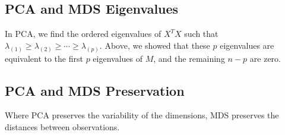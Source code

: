 \documentclass[a4paper]{article}
\begin{document}
\subsection{PCA and MDS Eigenvalues}
In PCA, we find the ordered eigenvalues of $X^TX$ such that 
$\lambda_{(1)} \ge \lambda_{(2)} \ge \cdots \ge \lambda_{(p)}$.  Above, we showed
that these $p$ eigenvalues are equivalent to the first $p$ eigenvalues
of $M$, and the remaining $n-p$ are zero.

\subsection{PCA and MDS Preservation}
Where PCA preserves the variability of the dimensions, MDS preserves the 
distances between observations.
\end{document}
